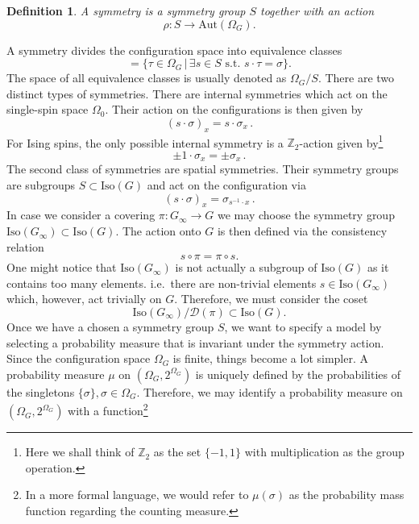 \documentclass{article}
\newtheorem{definition}[theorem]{Definition}
\newcommand{\Aut}{\mathrm{Aut}}
\newcommand{\Iso}{\mathrm{Iso}}
\begin{document}
\begin{definition}
    A symmetry is a symmetry group $S$ together with an action
    \begin{equation}
        \rho:S\to\Aut(\Omega_G).
    \end{equation}
\end{definition}
A symmetry divides the configuration space into equivalence classes
\begin{equation}
    [\sigma]=\{\tau\in\Omega_G\,|\,\exists s\in S\,\,\mathrm{s.t.}\,\,s\cdot\tau=\sigma\}.
\end{equation}
The space of all equivalence classes is usually denoted as $\Omega_G /S$. There are two distinct types of symmetries. There are internal symmetries which act on the single-spin space $\Omega_0$. Their action on the configurations is then given by
\begin{equation}
    (s\cdot\sigma)_x=s\cdot\sigma_x\,.
\end{equation}
For Ising spins, the only possible internal symmetry is a $\mathds{Z}_2$-action given by\footnote{Here we shall think of $\mathds{Z}_2$ as the set $\{-1,1\}$ with multiplication as the group operation.}
\begin{equation}
    \pm1\cdot\sigma_x=\pm\sigma_x\,.
\end{equation}
The second class of symmetries are spatial symmetries. Their symmetry groups are subgroups $S\subset\Iso(G)$ and act on the configuration via
\begin{equation}
    (s\cdot\sigma)_x=\sigma_{s^{-1}\cdot x}\,.
\end{equation}
In case we consider a covering $\pi:G_\infty\to G$ we may choose the symmetry group $\Iso(G_\infty)\subset\Iso(G)$. The action onto $G$ is then defined via the consistency relation
\begin{equation}
    s\circ\pi=\pi\circ s.
\end{equation}
One might notice that $\Iso(G_\infty)$ is not actually a subgroup of $\Iso(G)$ as it contains too many elements. i.e.\ there are non-trivial elements $s\in\Iso(G_\infty)$ which, however, act trivially on $G$. Therefore, we must consider the coset
\begin{equation}
    \Iso(G_\infty)/\mathcal{D}(\pi)\subset\Iso(G).
\end{equation}
Once we have a chosen a symmetry group $S$, we want to specify a model by selecting a probability measure that is invariant under the symmetry action. Since the configuration space $\Omega_G$ is finite, things become a lot simpler. A probability measure $\mu$ on $(\Omega_G,2^{\Omega_G})$ is uniquely defined by the probabilities of the singletons $\{\sigma\},\sigma\in\Omega_G$. Therefore, we may identify a probability measure on $(\Omega_G,2^{\Omega_G})$ with a function\footnote{In a more formal language, we would refer to $\mu(\sigma)$ as the probability mass function regarding the counting measure.}
\end{document}
